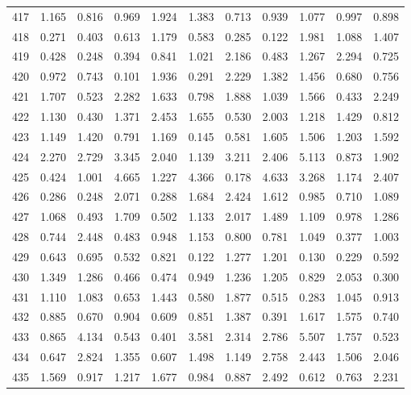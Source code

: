 \begin{tabular}{lrrrrrrrrrr}
417 &  1.165 &  0.816 &  0.969 &  1.924 &  1.383 &  0.713 &  0.939 &  1.077 &  0.997 &  0.898 \\
418 &  0.271 &  0.403 &  0.613 &  1.179 &  0.583 &  0.285 &  0.122 &  1.981 &  1.088 &  1.407 \\
419 &  0.428 &  0.248 &  0.394 &  0.841 &  1.021 &  2.186 &  0.483 &  1.267 &  2.294 &  0.725 \\
420 &  0.972 &  0.743 &  0.101 &  1.936 &  0.291 &  2.229 &  1.382 &  1.456 &  0.680 &  0.756 \\
421 &  1.707 &  0.523 &  2.282 &  1.633 &  0.798 &  1.888 &  1.039 &  1.566 &  0.433 &  2.249 \\
422 &  1.130 &  0.430 &  1.371 &  2.453 &  1.655 &  0.530 &  2.003 &  1.218 &  1.429 &  0.812 \\
423 &  1.149 &  1.420 &  0.791 &  1.169 &  0.145 &  0.581 &  1.605 &  1.506 &  1.203 &  1.592 \\
424 &  2.270 &  2.729 &  3.345 &  2.040 &  1.139 &  3.211 &  2.406 &  5.113 &  0.873 &  1.902 \\
425 &  0.424 &  1.001 &  4.665 &  1.227 &  4.366 &  0.178 &  4.633 &  3.268 &  1.174 &  2.407 \\
426 &  0.286 &  0.248 &  2.071 &  0.288 &  1.684 &  2.424 &  1.612 &  0.985 &  0.710 &  1.089 \\
427 &  1.068 &  0.493 &  1.709 &  0.502 &  1.133 &  2.017 &  1.489 &  1.109 &  0.978 &  1.286 \\
428 &  0.744 &  2.448 &  0.483 &  0.948 &  1.153 &  0.800 &  0.781 &  1.049 &  0.377 &  1.003 \\
429 &  0.643 &  0.695 &  0.532 &  0.821 &  0.122 &  1.277 &  1.201 &  0.130 &  0.229 &  0.592 \\
430 &  1.349 &  1.286 &  0.466 &  0.474 &  0.949 &  1.236 &  1.205 &  0.829 &  2.053 &  0.300 \\
431 &  1.110 &  1.083 &  0.653 &  1.443 &  0.580 &  1.877 &  0.515 &  0.283 &  1.045 &  0.913 \\
432 &  0.885 &  0.670 &  0.904 &  0.609 &  0.851 &  1.387 &  0.391 &  1.617 &  1.575 &  0.740 \\
433 &  0.865 &  4.134 &  0.543 &  0.401 &  3.581 &  2.314 &  2.786 &  5.507 &  1.757 &  0.523 \\
434 &  0.647 &  2.824 &  1.355 &  0.607 &  1.498 &  1.149 &  2.758 &  2.443 &  1.506 &  2.046 \\
435 &  1.569 &  0.917 &  1.217 &  1.677 &  0.984 &  0.887 &  2.492 &  0.612 &  0.763 &  2.231 \\

\end{tabular}
